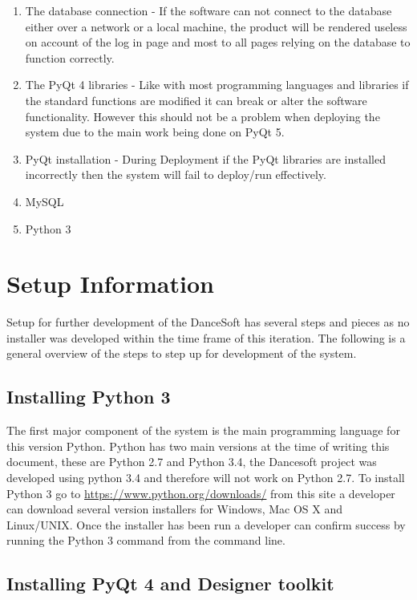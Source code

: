 \begin{enumerate}
\item The database connection - If the software can not connect to the database either over a network or a local machine, the product will be rendered useless on account of the log in page and most to all pages relying on the database to function correctly.
\item The PyQt 4 libraries - Like with most programming languages and libraries if the standard functions are modified it can break or alter the software functionality. However this should not be a problem when deploying the system due to the main work being done on PyQt 5.
\item PyQt installation - During Deployment if the PyQt libraries are installed incorrectly then the system will fail to deploy/run effectively.
\item MySQL
\item Python 3
\end{enumerate}



\section{Setup Information}
Setup for further development of the DanceSoft has several steps and pieces as no installer was developed within the time frame of this iteration. The following is a general overview of the steps to step up for development of the system.

\subsection{Installing Python 3}
The first major component of the system is the main programming language for this version Python. Python has two main versions at the time of writing this document, these are Python 2.7 and Python 3.4, the Dancesoft project was developed using python 3.4 and therefore will not work on Python 2.7.
To install Python 3 go to \url{https://www.python.org/downloads/} from this site a developer can download several version installers for Windows, Mac OS X and Linux/UNIX. Once the installer has been run a developer can confirm success by running the Python 3 command from the command line.

\subsection{Installing PyQt 4 and Designer toolkit }

